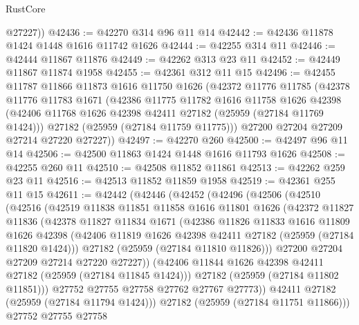 \begin{lexlean}{RustCore}
\begin{coremodule}
        @27227))
@42436 := @42270 @314 @96 @11 @14
@42442 := @42436 @11878 @1424 @1448 @1616 @11742 @1626
@42444 := @42255 @314 @11
@42446 := @42444 @11867 @11876
@42449 := @42262 @313 @23 @11
@42452 := @42449 @11867 @11874 @1958
@42455 := @42361 @312 @11 @15
@42496 := @42455
    @11787
    @11866
    @11873
    @1616
    @11750
    @1626
    (@42372
      @11776
      @11785
      (@42378
        @11776
        @11783
        @1671
        (@42386
          @11775
          @11782
          @1616
          @11758
          @1626
          @42398
          (@42406 @11768 @1626 @42398 @42411 @27182 (@25959 (@27184 @11769 @1424)))
          @27182
          (@25959 (@27184 @11759 @11775)))
        @27200
        @27204
        @27209
        @27214
        @27220
        @27227))
@42497 := @42270 @260
@42500 := @42497 @96 @11 @14
@42506 := @42500 @11863 @1424 @1448 @1616 @11793 @1626
@42508 := @42255 @260 @11
@42510 := @42508 @11852 @11861
@42513 := @42262 @259 @23 @11
@42516 := @42513 @11852 @11859 @1958
@42519 := @42361 @255 @11 @15
@42611 := @42442
    (@42446
      (@42452
        (@42496
          (@42506
            (@42510
              (@42516
                (@42519
                  @11838
                  @11851
                  @11858
                  @1616
                  @11801
                  @1626
                  (@42372
                    @11827
                    @11836
                    (@42378
                      @11827
                      @11834
                      @1671
                      (@42386
                        @11826
                        @11833
                        @1616
                        @11809
                        @1626
                        @42398
                        (@42406 @11819 @1626 @42398 @42411 @27182 (@25959 (@27184 @11820 @1424)))
                        @27182
                        (@25959 (@27184 @11810 @11826)))
                      @27200
                      @27204
                      @27209
                      @27214
                      @27220
                      @27227))
                  (@42406 @11844 @1626 @42398 @42411 @27182 (@25959 (@27184 @11845 @1424)))
                  @27182
                  (@25959 (@27184 @11802 @11851)))
                @27752
                @27755
                @27758
                @27762
                @27767
                @27773))
            @42411
            @27182
            (@25959 (@27184 @11794 @1424)))
          @27182
          (@25959 (@27184 @11751 @11866)))
        @27752
        @27755
        @27758

\end{coremodule}
\end{lexlean}
